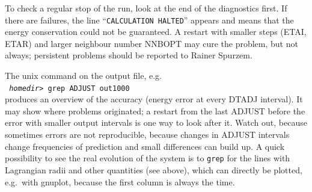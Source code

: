 \newpage

To check a regular stop of the run, look at the end of the
diagnostics first.
If there are failures, the line ``{\tt CALCULATION HALTED}''
appears and means that the energy conservation could not be
guaranteed.
A restart with smaller steps (ETAI, ETAR) and larger neighbour
number NNBOPT may cure the problem, but not always;
persistent problems should be reported to Rainer Spurzem.

The unix command on the output file, e.g.\\

\noindent
{\tt
  {\it homedir}> grep ADJUST out1000
}\\

\noindent
produces an overview of the accuracy (energy error at every
DTADJ interval).
It may show where problems originated; a restart from the last
ADJUST before the error with smaller output intervals is one
way to look after it.
Watch out, because sometimes errors are not reproducible,
because changes in ADJUST intervals change frequencies of
prediction and small differences can build up.
A quick possibility to see the real evolution of the system
is to {\tt grep} for the lines with Lagrangian radii and other
quantities (see above), which can directly be plotted, e.g.\
with gnuplot, because the first column is always the time.


